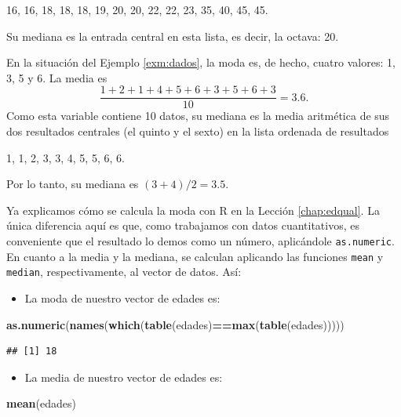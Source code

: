 \documentclass[]{book}
\newenvironment{Shaded}{\begin{snugshade}}{\end{snugshade}}
\newcommand{\KeywordTok}[1]{\textcolor[rgb]{0.13,0.29,0.53}{\textbf{#1}}}
\newcommand{\NormalTok}[1]{#1}
\newcommand{\OperatorTok}[1]{\textcolor[rgb]{0.81,0.36,0.00}{\textbf{#1}}}
\providecommand{\tightlist}{%
  \setlength{\itemsep}{0pt}\setlength{\parskip}{0pt}}
\theoremstyle{definition}
\theoremstyle{definition}
\theoremstyle{definition}
\theoremstyle{remark}
\begin{document}
16, 16, 18, 18, 18, 19, 20, 20, 22, 22, 23, 35, 40, 45, 45.

Su mediana es la entrada central en esta lista, es decir, la octava: 20.

En la situación del Ejemplo \ref{exm:dados}, la moda es, de hecho, cuatro valores: 1, 3, 5 y 6. La media es
\[
\frac{1+2+1+4+5+6+3+5+6+3}{10}=3.6.
\]
Como esta variable contiene 10 datos, su mediana es la media aritmética de sus dos resultados centrales (el quinto y el sexto) en la lista ordenada de resultados

1, 1, 2, 3, 3, 4, 5, 5, 6, 6.

Por lo tanto, su mediana es \((3+4)/2=3.5\).

Ya explicamos cómo se calcula la moda con R en la Lección \ref{chap:edqual}. La única diferencia aquí es que, como trabajamos con datos cuantitativos, es conveniente que el resultado lo demos como un número, aplicándole \texttt{as.numeric}. En cuanto a la media y la mediana, se calculan aplicando las funciones \texttt{mean} y \texttt{median}, respectivamente, al vector de datos. Así:

\begin{itemize}
\tightlist
\item
  La moda de nuestro vector de edades es:
\end{itemize}

\begin{Shaded}
\begin{Highlighting}[]
\KeywordTok{as.numeric}\NormalTok{(}\KeywordTok{names}\NormalTok{(}\KeywordTok{which}\NormalTok{(}\KeywordTok{table}\NormalTok{(edades)}\OperatorTok{==}\KeywordTok{max}\NormalTok{(}\KeywordTok{table}\NormalTok{(edades)))))}
\end{Highlighting}
\end{Shaded}

\begin{verbatim}
## [1] 18
\end{verbatim}

\begin{itemize}
\tightlist
\item
  La media de nuestro vector de edades es:
\end{itemize}

\begin{Shaded}
\begin{Highlighting}[]
\KeywordTok{mean}\NormalTok{(edades)}
\end{Highlighting}
\end{Shaded}
\end{document}
